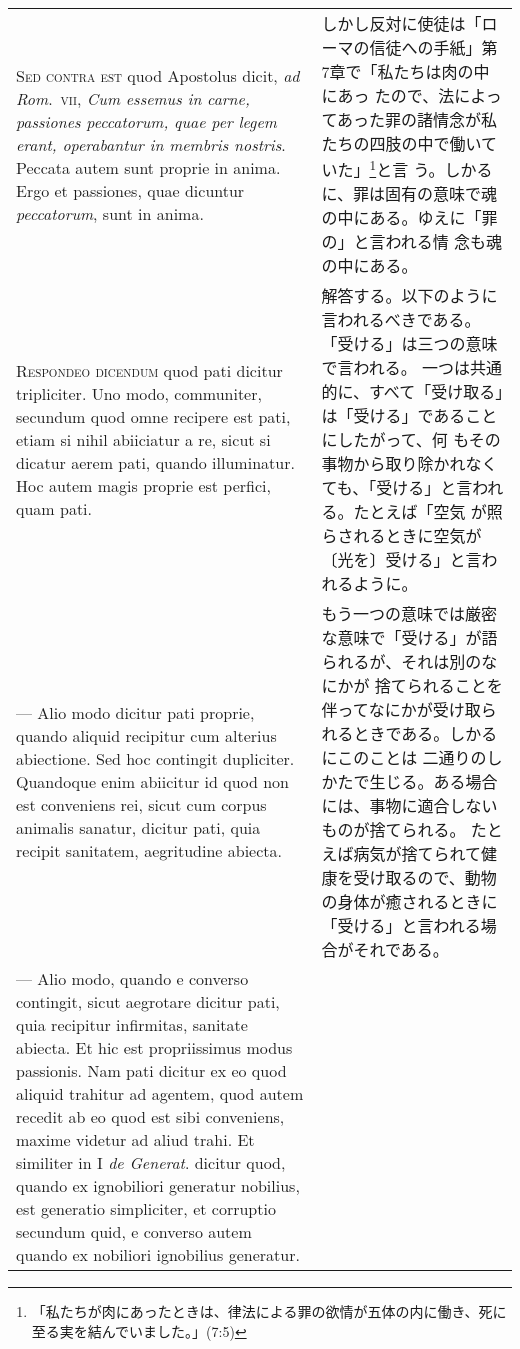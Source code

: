 \documentclass[10pt]{jsarticle} %
\begin{document}
\begin{longtable}{p{21em}p{21em}}
{\scshape Sed contra est} quod Apostolus dicit, {\itshape ad Rom}.~{\scshape vii}, {\itshape Cum essemus in carne,
 passiones peccatorum, quae per legem erant, operabantur in membris
 nostris}. Peccata autem sunt proprie in anima. Ergo et passiones, quae
 dicuntur {\itshape peccatorum}, sunt in anima.

&

しかし反対に使徒は「ローマの信徒への手紙」第7章で「私たちは肉の中にあっ
 たので、法によってあった罪の諸情念が私たちの四肢の中で働いていた」\footnote{「私たちが肉にあったときは、律法による罪の欲情が五体の内に働き、死に至る実を結んでいました。」(7:5)}と言
 う。しかるに、罪は固有の意味で魂の中にある。ゆえに「罪の」と言われる情
 念も魂の中にある。


\\



{\scshape Respondeo dicendum} quod pati dicitur tripliciter. Uno modo, communiter,
 secundum quod omne recipere est pati, etiam si nihil abiiciatur a re,
 sicut si dicatur aerem pati, quando illuminatur. Hoc autem magis
 proprie est perfici, quam pati. 

&

解答する。以下のように言われるべきである。「受ける」は三つの意味で言われる。
一つは共通的に、すべて「受け取る」は「受ける」であることにしたがって、何
 もその事物から取り除かれなくても、「受ける」と言われる。たとえば「空気
 が照らされるときに空気が〔光を〕受ける」と言われるように。



\\
--- Alio modo dicitur pati proprie, quando
 aliquid recipitur cum alterius abiectione. Sed hoc contingit
 dupliciter. Quandoque enim abiicitur id quod non est conveniens rei,
 sicut cum corpus animalis sanatur, dicitur pati, quia recipit
 sanitatem, aegritudine abiecta. 

&

もう一つの意味では厳密な意味で「受ける」が語られるが、それは別のなにかが
捨てられることを伴ってなにかが受け取られるときである。しかるにこのことは
二通りのしかたで生じる。ある場合には、事物に適合しないものが捨てられる。
 たとえば病気が捨てられて健康を受け取るので、動物の身体が癒されるときに
「受ける」と言われる場合がそれである。


\\

--- Alio modo, quando e converso contingit,
 sicut aegrotare dicitur pati, quia recipitur infirmitas, sanitate
 abiecta. Et hic est propriissimus modus passionis. Nam pati dicitur ex
 eo quod aliquid trahitur ad agentem, quod autem recedit ab eo quod est
 sibi conveniens, maxime videtur ad aliud trahi. Et similiter in I {\itshape de
 Generat}. dicitur quod, quando ex ignobiliori generatur nobilius, est
 generatio simpliciter, et corruptio secundum quid, e converso autem
 quando ex nobiliori ignobilius generatur. 



\end{longtable}
\end{document}

